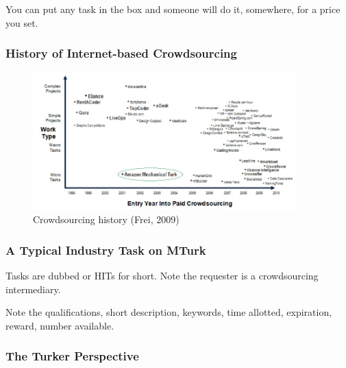 \documentclass[slides]{beamer} %
\begin{document}
\begin{frame}

You can put any task in the box and someone will do it, somewhere, for a price you set.


\end{frame}

\begin{frame}
\frametitle{History of Internet-based Crowdsourcing}

\begin{figure}[htp]
\centering
\includegraphics[width=4in]{images/history_of_crowdsourcing.jpg}
\caption{Crowdsourcing history (Frei, 2009)}
\end{figure}

\end{frame}


\begin{frame}\frametitle{A Typical Industry Task on MTurk}

Tasks are dubbed  or HITs for short. Note the requester is a crowdsourcing intermediary.


Note the qualifications, short description, keywords, time allotted, expiration, reward, number available.

\end{frame}

\begin{frame}\frametitle{The Turker Perspective}


\end{frame}
\end{document}
